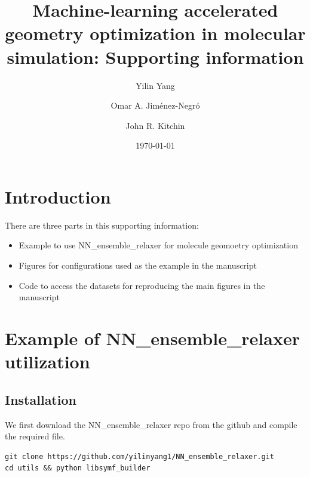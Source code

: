 \documentclass[aps,prl,citeautoscript,preprint,citeautoscript,showkeys]{revtex4-1}
\date{}
\title{}
\begin{document}
\raggedbottom

\title{Machine-learning accelerated geometry optimization in molecular simulation: Supporting information}

\author{Yilin Yang}

\author{Omar A. Jiménez-Negró}

\author{John R. Kitchin}

\date{\today}
\maketitle
\tableofcontents

\section{Introduction}
\label{sec:org7f08ef2}

There are three parts in this supporting information:
\begin{itemize}
\item Example to use NN\_ensemble\_relaxer for molecule geomoetry optimization
\item Figures for configurations used as the example in the manuscript
\item Code to access the datasets for reproducing the main figures in the manuscript
\end{itemize}

\section{Example of NN\_ensemble\_relaxer utilization}
\label{sec:orgc201d95}

\subsection{Installation}
\label{sec:orga4f74f0}

We first download the NN\_ensemble\_relaxer repo from the github and compile the required file.

\begin{verbatim}
git clone https://github.com/yilinyang1/NN_ensemble_relaxer.git
cd utils && python libsymf_builder
\end{verbatim}
\end{document}
